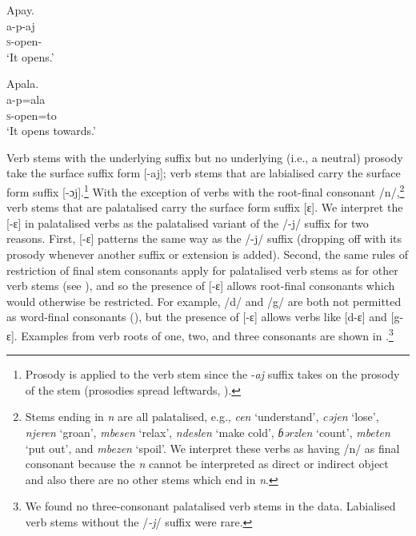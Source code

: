 \ea \label{ex:6:5}
Apay.\\
\gll  a-p-aj\\
      \textsc{s}-open-{\CL}\\
\glt  ‘It opens.’
\z

\clearpage
\ea \label{ex:6:6}
Apala.\\
\gll  a-p=ala\\
      \textsc{s}-open=to\\
\glt  ‘It opens towards.’
\z

Verb stems with the underlying suffix but no underlying (i.e., a neutral) prosody take the surface suffix form [{}-aj]; verb stems that are labialised carry the surface form suffix [{}-ɔj].\footnote{Prosody is applied to the verb stem since the -\textit{aj} suffix takes on the prosody of the stem (prosodies spread leftwards, ).} With the exception of verbs with the root-final consonant /n/,\footnote{Stems ending in \textit{n} are all palatalised, e.g., \textit{cen} ‘understand’, \textit{cəjen} ‘lose’, \textit{njeren} ‘groan’, \textit{mbesen} ‘relax’, \textit{ndeslen} ‘make cold’, \textit{ɓərzlen} ‘count’, \textit{mbeten} ‘put out’, and \textit{mbezen} ‘spoil’.  We interpret these verbs as having /n/ as final consonant because the \textit{n} cannot be interpreted as direct or indirect object and also there are no other stems which end in \textit{n}. } verb stems that are palatalised carry the surface form suffix [{}ɛ]. We interpret the [{}-ɛ] in palatalised verbs as the palatalised variant of the /-j/ suffix for two reasons. First, [{}-ɛ] patterns the same way as the /-j/ suffix (dropping off with its prosody whenever another suffix or extension is added). Second, the same rules of restriction of final stem consonants apply for palatalised verb stems as for other verb stems (see ), and so the presence of [{}-ɛ]  allows root-final consonants which would otherwise be restricted. For example, /d/ and /g/ are both not permitted as word-final consonants (), but the presence of [{}-ɛ] allows verbs like [d-ɛ]  and [g-ɛ]. Examples from verb roots of one, two, and three consonants are shown in .\footnote{We found no three-consonant palatalised verb stems in the data. Labialised verb stems without the /\textit{{}-j}/ suffix were rare.}

